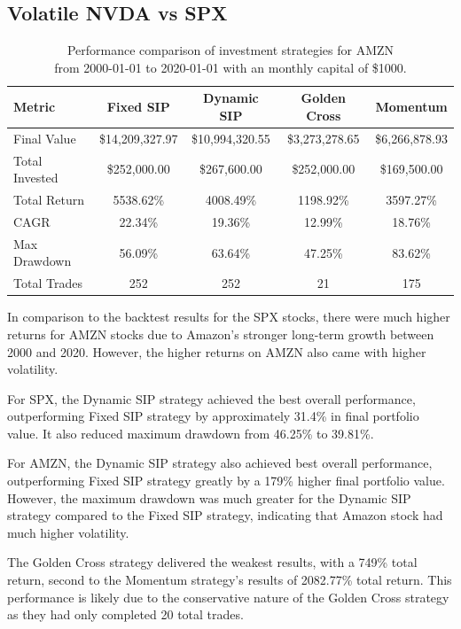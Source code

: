 \documentclass[12pt]{article}
\begin{document}
\subsection{Volatile NVDA vs SPX}
\begin{table}[H]
\centering
\begin{tabular}{|l|c|c|c|c|}
\hline
\textbf{Metric} & \textbf{Fixed SIP} & \textbf{Dynamic SIP} & \textbf{Golden Cross} & \textbf{Momentum} \\
\hline
Final Value & \$14,209,327.97 & \$10,994,320.55 & \$3,273,278.65 & \$6,266,878.93 \\
Total Invested & \$252,000.00 & \$267,600.00 & \$252,000.00 & \$169,500.00 \\
Total Return & 5538.62\% & 4008.49\% & 1198.92\% & 3597.27\% \\
CAGR & 22.34\% & 19.36\% & 12.99\% & 18.76\% \\
Max Drawdown & 56.09\% & 63.64\% & 47.25\% & 83.62\% \\
Total Trades & 252 & 252 & 21 & 175 \\
\hline
\end{tabular}
\caption{Performance comparison of investment strategies for AMZN\\ 
from 2000-01-01 to 2020-01-01 with an monthly capital of \$1000.}
\end{table}

In comparison to the backtest results for the SPX stocks, there were much higher returns for AMZN stocks 
due to Amazon's stronger long-term growth between 2000 and 2020. However, the higher returns on AMZN also 
came with higher volatility. 

For SPX, the Dynamic SIP strategy achieved the best overall performance, outperforming Fixed SIP strategy by 
approximately 31.4\% in final portfolio value. It also reduced maximum drawdown from 46.25\% to 39.81\%. 

For AMZN, the Dynamic SIP strategy also achieved best overall performance, outperforming Fixed SIP strategy 
greatly by a 179\% higher final portfolio value. However, the maximum drawdown was much greater for the 
Dynamic SIP strategy compared to the Fixed SIP strategy, indicating that Amazon stock had much higher 
volatility. 

The Golden Cross strategy delivered the weakest results, with a 749\% total return, second to the Momentum 
strategy's results of 2082.77\% total return. This performance is likely due to the conservative nature of 
the Golden Cross strategy as they had only completed 20 total trades. 
\end{document}
